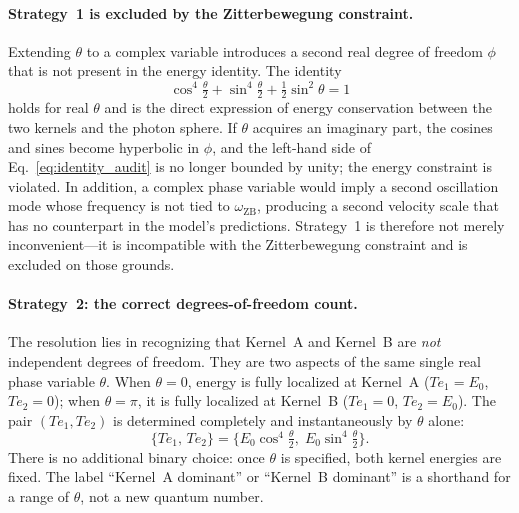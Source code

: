 \documentclass[%
 reprint, amsmath,amssymb, aps, prb, ]{revtex4-2}
\numberwithin{equation}{section}
\newcommand{\iphase}{\theta}
\begin{document}
\paragraph{Strategy~1 is excluded by the Zitterbewegung constraint.}
Extending $\iphase$ to a complex variable introduces a second real degree of freedom $\phi$ that is not present in the energy identity. The identity
\begin{equation}
\cos^4\!\tfrac{\iphase}{2} + \sin^4\!\tfrac{\iphase}{2} + \tfrac{1}{2}\sin^2\iphase = 1
\label{eq:identity_audit}
\end{equation}
holds for real $\iphase$ and is the direct expression of energy conservation between the two kernels and the photon sphere. If $\iphase$ acquires an imaginary part, the cosines and sines become hyperbolic in $\phi$, and the left-hand side of Eq.~\eqref{eq:identity_audit} is no longer bounded by unity; the energy constraint is violated. In addition, a complex phase variable would imply a second oscillation mode whose frequency is not tied to $\omega_\mathrm{ZB}$, producing a second velocity scale that has no counterpart in the model's predictions. Strategy~1 is therefore not merely inconvenient---it is incompatible with the Zitterbewegung constraint and is excluded on those grounds.

\paragraph{Strategy~2: the correct degrees-of-freedom count.}
The resolution lies in recognizing that Kernel~A and Kernel~B are \emph{not} independent degrees of freedom. They are two aspects of the same single real phase variable $\iphase$. When $\iphase = 0$, energy is fully localized at Kernel~A ($Te_1 = E_0$, $Te_2 = 0$); when $\iphase = \pi$, it is fully localized at Kernel~B ($Te_1 = 0$, $Te_2 = E_0$). The pair $(Te_1, Te_2)$ is determined completely and instantaneously by $\iphase$ alone:
\begin{equation}
\{Te_1,\, Te_2\} = \{E_0\cos^4\!\tfrac{\iphase}{2},\; E_0\sin^4\!\tfrac{\iphase}{2}\}.
\label{eq:kernel_phase}
\end{equation}
There is no additional binary choice: once $\iphase$ is specified, both kernel energies are fixed. The label ``Kernel~A dominant'' or ``Kernel~B dominant'' is a shorthand for a range of $\iphase$, not a new quantum number.
\end{document}
